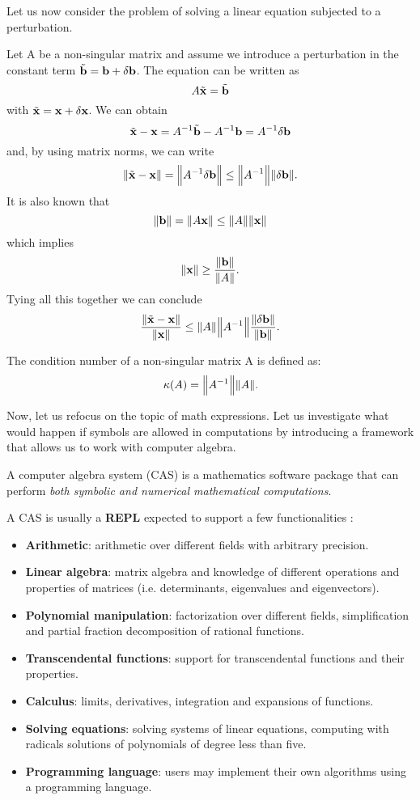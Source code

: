 Let us now consider the problem of solving a linear equation subjected to a perturbation.

Let A be a non-singular matrix and assume we introduce a perturbation in the constant term
\(\tilde{\vb{b}} = \vb{b} +  \delta \vb{b}\). The equation can be written as
\[
    A\tilde{\vb{x}} = \tilde{\vb{b}}
\]
with \(\tilde{\vb{x}} = \vb{x} + \delta \vb{x}\). We can obtain
\[
    \tilde{\vb{x}} - \vb{x} = A^{-1} \tilde{\vb{b}} - A^{-1} \vb{b} = A^{-1} \delta \vb{b}
\]
and, by using matrix norms, we can write
\[
    \norm{\tilde{\vb{x}} - \vb{x}} = \norm{A^{-1} \delta \vb{b}} \leq \norm{A^{-1}} \norm{\delta \vb{b}}.
\]
It is also known that
\[
    \norm{\vb{b}} = \norm{A \vb{x}} \leq \norm{A} \norm{\vb{x}}
\]
which implies
\[
    \norm{\vb{x}} \geq \dfrac{\norm{\vb{b}}}{\norm{A}}.
\]
Tying all this together we can conclude
\[
    \dfrac{\norm{\tilde{\vb{x}} - \vb{x}}}{\norm{\vb{x}}} \leq \norm{A} \norm{A^{-1}}
    \dfrac{\norm{\delta \vb{b}}}{\norm{\vb{b}}}.
\]

\begin{definition}
    The condition number of a non-singular matrix A is defined as:
    \[
        \kappa(A) = \norm{A^{-1}} \norm{A}.
    \]
\end{definition}

Now, let us refocus on the topic of math expressions.
Let us investigate what would happen if symbols are allowed in computations by introducing a framework that allows
us to work with computer algebra.
\begin{definition}
    A computer algebra system (CAS) is a mathematics software package that can perform \textit{both symbolic and numerical
    mathematical computations}.
\end{definition}

A CAS is usually a \textbf{REPL} expected to support a few functionalities \cite{introcas}:
\begin{itemize}[topsep=0pt, itemsep=0pt, parsep=0pt]
    \item \textbf{Arithmetic}:
        arithmetic over different fields with arbitrary precision.
    \item \textbf{Linear algebra}:
        matrix algebra and knowledge of different operations and properties of matrices
        (i.e. determinants, eigenvalues and eigenvectors).
    \item \textbf{Polynomial manipulation}:
        factorization over different fields, simplification and partial fraction decomposition of rational functions.
    \item \textbf{Transcendental functions}:
        support for transcendental functions and their properties.
    \item \textbf{Calculus}:
        limits, derivatives, integration and expansions of functions.
    \item \textbf{Solving equations}:
        solving systems of linear equations, computing with radicals solutions of polynomials of degree less than five.
    \item \textbf{Programming language}:
        users may implement their own algorithms using a programming language.
\end{itemize}

